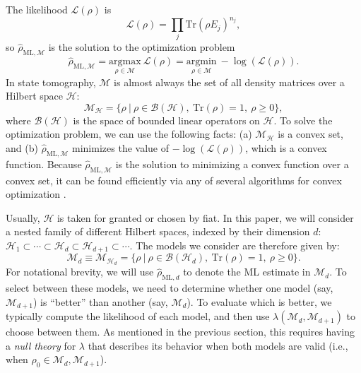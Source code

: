 \documentclass[aps,pra, twocolumn]{revtex4-1}
\newcommand{\M}{\mathcal{M}}
\newcommand{\cH}{\mathcal{H}}
\newcommand{\cL}{\mathcal{L}}
\newcommand{\rhohat}{\hat{\rho}}
\newcommand{\rhoML}[1]{\rhohat_{\scriptscriptstyle{\mathrm{ML},#1}}}
\begin{document}
The likelihood $\mathcal{L}(\rho)$ is
\begin{equation}
\mathcal{L}(\rho) = \prod_{j}\mathrm{Tr}(\rho E_{j})^{n_{j}},
\end{equation}
so $\rhoML{\M}$ is the solution to the optimization problem
\begin{equation}
\label{eq:mle}
\rhoML{\M} = \underset{\rho \in \M}{\text{argmax}}~\mathcal{L}(\rho) = \underset{\rho \in \M}{\text{argmin}}~-\log(\mathcal{L}(\rho)).
\end{equation}
In state tomography, $\M$ is almost always the set of all density matrices over a Hilbert space $\cH$:
\begin{equation}
\mathcal{M}_{\cH} = \{\rho~|~\rho \in \mathcal{B}(\mathcal{H}),~\mathrm{Tr}(\rho) =1,~\rho \geq 0\},
\end{equation}
where $\mathcal{B}(\cH)$ is the space of bounded linear operators on $\cH$.  To solve the optimization problem, we can use the following facts: (a) $\M_{\cH}$ is a convex set, and (b) $\rhoML{\M}$ minimizes the value of $-\log(\cL(\rho))$, which is a convex function. Because $\rhoML{\M}$ is the solution to minimizing a convex function  over a convex set, it can be found efficiently via any of several algorithms for convex optimization \cite{Boyd}.

Usually, $\cH$ is taken for granted or chosen by fiat.  In this paper, we will consider a nested family of different Hilbert spaces, indexed by their dimension $d$: $\cH_{1}  \subset \cdots \subset \cH_{d} \subset \cH_{d+1} \subset \cdots$.  The models we consider are therefore given by:
\begin{equation}
\label{eq:modelsd}
\M_{d} \equiv \mathcal{M}_{\cH_{d}} = \{\rho~|~\rho \in \mathcal{B}(\mathcal{H}_{d}),~\mathrm{Tr}(\rho) =1,~\rho \geq 0\}.
\end{equation}
For notational brevity, we will use $\rhoML{d}$ to denote the ML estimate in $\M_{d}$. To select between these models, we need to determine whether one model (say, $\M_{d + 1}$) is ``better'' than another (say, $\M_{d}$).  To evaluate which is better, we typically compute the likelihood of each model, and then use $\lambda(\M_{d}, \M_{d+1})$ to choose between them. As mentioned in the previous section, this requires having a \emph{null theory} for $\lambda$ that describes its behavior when both models are valid (i.e., when $\rho_{0} \in \M_{d},\M_{d + 1}$).
\end{document}
